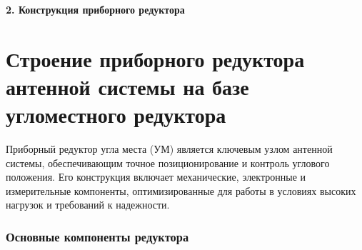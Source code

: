 \newpage
\begin{center}
  \textbf{\large 2. Конструкция приборного редуктора}
\end{center}


\section{Строение приборного редуктора антенной системы на базе угломестного редуктора}

Приборный редуктор угла места (УМ) является ключевым узлом антенной системы, обеспечивающим точное позиционирование и контроль углового положения. Его конструкция включает механические, электронные и измерительные компоненты, оптимизированные для работы в условиях высоких нагрузок и требований к надежности.

\subsubsection*{Основные компоненты редуктора}

